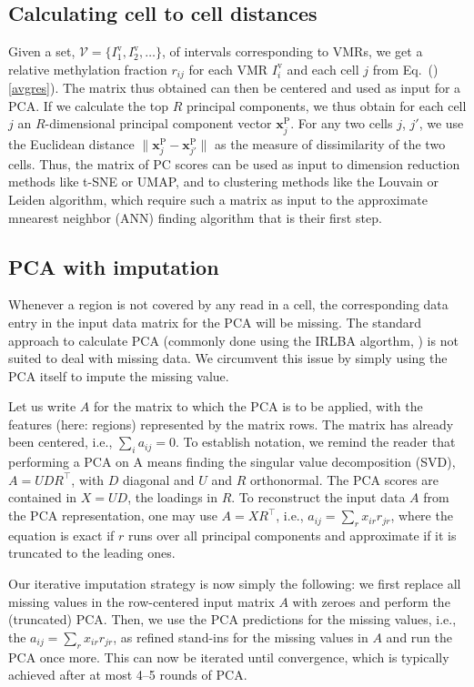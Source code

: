 \documentclass[twocolumn,10pt]{article}
\begin{document}
\subsection{Calculating cell to cell distances}

Given a set, $\mathcal{V}=\{I^\text{v}_1,I^\text{v}_2,\dots\}$, of intervals corresponding to VMRs, we get a relative methylation fraction $r_{ij}$ for each VMR $I^\text{v}_i$ and each cell $j$ from Eq.\ ()\ref{avgres}). The matrix thus obtained can then be centered and used as input for a PCA. If we calculate the top $R$ principal components, we thus obtain for each cell $j$ an $R$-dimensional principal component vector $\mathbf{x}^\text{P}_j$. For any two cells $j$, $j'$, we use the Euclidean distance $\|\mathbf{x}^\text{P}_j - \mathbf{x}^\text{P}_{j'}\|$ as the measure of dissimilarity of the two cells.
Thus, the matrix of PC scores can be used as input to dimension reduction methods like t-SNE or UMAP, and to clustering methods like the Louvain or Leiden algorithm, which require such a matrix as input to the approximate mnearest neighbor (ANN) finding algorithm that is their first step.

\subsection{PCA with imputation}

Whenever a region is not covered by any read in a cell, the corresponding data entry in the input data matrix for the PCA will be missing. The standard approach to calculate PCA (commonly done using the IRLBA algorthm, \citep{Baglama2005}) is not suited to deal with missing data. We circumvent this issue by simply using the PCA itself to impute the missing value.

Let us write $A$ for the matrix to which the PCA is to be applied, with the features (here: regions) represented by the matrix rows. The matrix has already been centered, i.e., $\sum_i a_{ij}=0$. To establish notation, we remind the reader that performing a PCA on A means finding the singular value decomposition (SVD), $A=UDR^\top$, with $D$ diagonal and $U$ and $R$ orthonormal. The PCA scores are contained in $X=UD$, the loadings in $R$. To reconstruct the input data $A$ from the PCA representation, one may use $A=XR^\top$, i.e., $a_{ij}=\sum_r x_{ir} r_{jr}$, where the equation is exact if $r$ runs over all principal components and approximate if it is truncated to the leading ones.

Our iterative imputation strategy is now simply the following: we first replace all missing values in the row-centered input matrix $A$ with zeroes and perform the (truncated) PCA. Then, we use the PCA predictions for the missing values, i.e., the $a_{ij}=\sum_r x_{ir} r_{jr}$, as refined stand-ins for the missing values in $A$ and run the PCA once more. This can now be iterated until convergence, which is typically achieved after at most 4--5 rounds of PCA.
\end{document}
